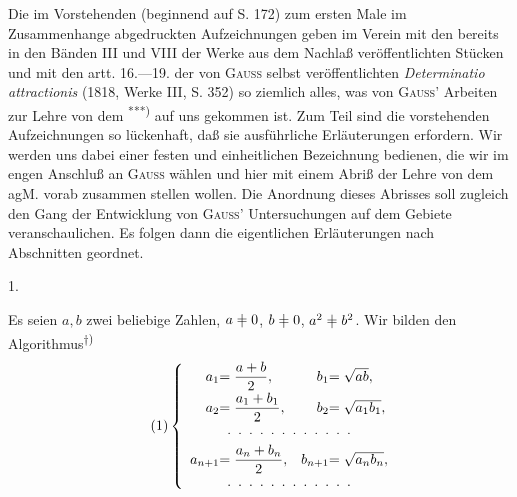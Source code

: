 \begingroup
\makeatletter\tagsleft@true\let\veqno\@@leqno\makeatother
\newcommand{\AgmNotEqual}{\mathrel{\ooalign{\hfil$=$\hfil\cr\hfil$|$\hfil\cr}}}
\par\indent Die im Vorstehenden (beginnend auf S. 172) zum ersten Male im Zusammenhange abgedruckten Aufzeichnungen geben im Verein mit den bereits in den Bänden III und VIII der Werke aus dem Nachlaß veröffentlichten Stücken und mit den artt. 16.—19. der von \textsc{Gauss} selbst veröffentlichten \textit{Determinatio attractionis} (1818, Werke III, S. 352) so ziemlich alles, was von \textsc{Gauss}’ Arbeiten zur Lehre von dem \textsuperscript{***)} auf uns gekommen ist. Zum Teil sind die vorstehenden Aufzeichnungen so lückenhaft, daß sie ausführliche Erläuterungen erfordern. Wir werden uns dabei einer festen und einheitlichen Bezeichnung bedienen, die wir im engen Anschluß an \textsc{Gauss} wählen und hier mit einem Abriß der Lehre von dem agM. vorab zusammen stellen wollen. Die Anordnung dieses Abrisses soll zugleich den Gang der Entwicklung von \textsc{Gauss}’ Untersuchungen auf dem Gebiete veranschaulichen. Es folgen dann die eigentlichen Erläuterungen nach Abschnitten geordnet.
\begin{center}\end{center}
\begin{center}1.\end{center}
\par\indent Es seien $a,b$ zwei beliebige Zahlen, $a\AgmNotEqual0$, $b\AgmNotEqual0$, $a^2\AgmNotEqual b^2$. Wir bilden den Algorithmus\textsuperscript{$\dagger$)}
\begin{equation*}\tag*{(1)}
\left\{\begin{array}{r@{}l@{\quad}r@{}l}
a_1&=\dfrac{a+b}{2},& b_1&=\sqrt{ab},\\[5pt]
a_2&=\dfrac{a_1+b_1}{2},& b_2&=\sqrt{a_1b_1},\\[4pt]
\multicolumn{4}{c}{.\enspace.\enspace.\enspace.\enspace.\enspace.\enspace.\enspace.\enspace.\enspace.\enspace.\enspace.}\\[4pt]
a_{n+1}&=\dfrac{a_n+b_n}{2},& b_{n+1}&=\sqrt{a_nb_n},\\[4pt]
\multicolumn{4}{c}{.\enspace.\enspace.\enspace.\enspace.\enspace.\enspace.\enspace.\enspace.\enspace.\enspace.\enspace.}
\end{array}\right.
\end{equation*}
